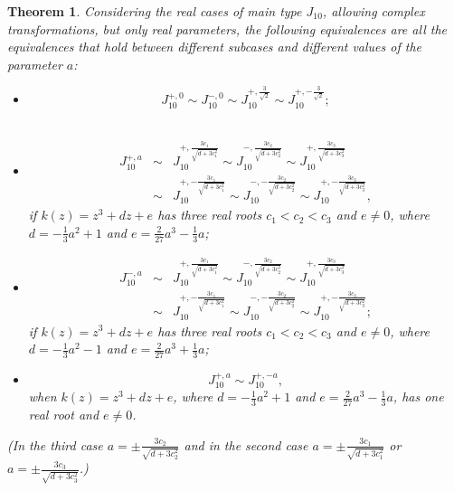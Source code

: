\documentclass[noend]{amsproc}
\newtheorem{theorem}{Theorem}
\theoremstyle{definition}
\begin{document}
\begin{theorem}
Considering the real cases of main type $J_{10}$, allowing complex transformations, but only real parameters, the following equivalences are all the equivalences that hold between different subcases and different values of the parameter $a$:
\begin{itemize}
\item \begin{equation*}
J_{10}^{+,0}\sim J_{10}^{-,0} \sim J_{10}^{+,\frac{3}{\sqrt{2}}}\sim J_{10}^{+,-\frac{3}{\sqrt{2}}};\end{equation*}\\
\item \begin{eqnarray*}
J_{10}^{+,a}&\sim& J_{10}^{+, \frac{3c_1}{\sqrt{d+3c_1^2}}}\sim J_{10}^{-, \frac{3c_2}{\sqrt{d+3c_2^2}}}\sim J_{10}^{+,\frac{3c_3}{\sqrt{d+3c_3^2}}}\\
&\sim& J_{10}^{+,- \frac{3c_1}{\sqrt{d+3c_1^2}}}\sim J_{10}^{-,- \frac{3c_2}{\sqrt{d+3c_2^2}}}\sim J_{10}^{+,- \frac{3c_3}{\sqrt{d+3c_3^2}}},\end{eqnarray*}
if $k(z)=z^3+dz+e$ has three real roots $c_1<c_2<c_3$ and $e\neq 0$, where $d=-\frac{1}{3}a^2+1$ and $e=\frac{2}{27}a^3-\frac{1}{3}a$;\\
\item \begin{eqnarray*}
J_{10}^{-,a}&\sim& J_{10}^{+,\frac{3c_1}{\sqrt{d+3c_1^2}}}\sim J_{10}^{-,\frac{3c_2}{\sqrt{d+3c_2^2}}}\sim J_{10}^{+,\frac{3c_3}{\sqrt{d+3c_3^2}}}\\
&\sim& J_{10}^{+,-\frac{3c_1}{\sqrt{d+3c_1^2}}}\sim J_{10}^{-,-\frac{3c_2}{\sqrt{d+3c_2^2}}}\sim J_{10}^{+,-\frac{3c_3}{\sqrt{d+3c_3^2}}};\end{eqnarray*}
if $k(z)=z^3+dz+e$ has three real roots $c_1<c_2<c_3$ and $e\neq 0$, where $d=-\frac{1}{3}a^2-1$ and $e=\frac{2}{27}a^3+\frac{1}{3}a$;\\
\item \begin{equation*}
J_{10}^{+,a}\sim J_{10}^{+,-a},
\end{equation*}
when $k(z)=z^3+dz+e$, where  $d=-\frac{1}{3}a^2+1$ and $e=\frac{2}{27}a^3-\frac{1}{3}a$, has one real root and $e\neq 0$.
\end{itemize}
(In the third case $a=\pm \frac{3c_2}{\sqrt{d+3c_2^2}}$ and in the second case $a=\pm\frac{3c_1}{\sqrt{d+3c_1^2}}$ or $a=\pm \frac{3c_3}{\sqrt{d+3c_3^2}}$.)



\end{theorem}
\end{document}
